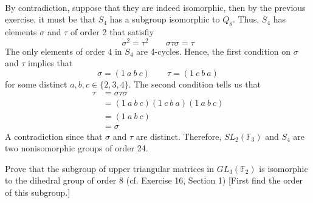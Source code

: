 \begin{solution}
    \\ By contradiction, suppose that they are indeed isomorphic, then by the previous exercise, it must be that $S_4$ has a subgroup isomorphic to $Q_8$. Thus, $S_4$ has elements $\sigma$ and $\tau$ of order 2 that satisfiy
    $$\sigma^2 = \tau^2 \qquad \sigma\tau\sigma = \tau$$
    The only elements of order $4$ in $S_4$ are 4-cycles. Hence, the first condition on $\sigma$ and $\tau$ implies that 
    $$\sigma = (1 \ a \ b \ c) \qquad \tau = (1 \ c \ b \ a)$$
    for some distinct $a,b,c \in \{2,3,4\}$. The second condition tells us that 
    \begin{align*}
        \tau &= \sigma\tau\sigma \\
        &= (1 \ a \ b \ c) (1 \ c \ b \ a) (1 \ a \ b \ c) \\
        &= (1 \ a \ b \ c) \\
        &= \sigma
    \end{align*}
    A contradiction since that $\sigma$ and $\tau$ are distinct. Therefore, $SL_2(\mathbb{F}_3)$ and $S_4$ are two nonisomorphic groups of order 24. \\
\end{solution}

\begin{exercise}
    Prove that the subgroup of upper triangular matrices in $GL_3(\mathbb{F}_2)$ is isomorphic to the dihedral group of order 8 (cf. Exercise 16, Section 1) [First find the order of this subgroup.] \\
\end{exercise}

